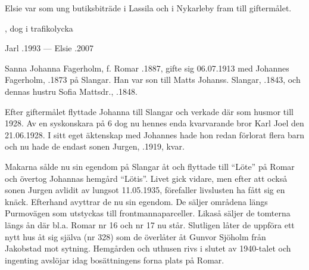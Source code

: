 Elsie var som ung butiksbiträde i Lassila och i Nykarleby fram till giftermålet.
\begin{jhchildren}
  \item {}
  \item {}, dog i trafikolycka
\end{jhchildren}

Jarl .1993  ---  Elsie .2007



%

%
Sanna Johanna Fagerholm, f. Romar .1887, gifte sig 06.07.1913 med Johannes Fagerholm, .1873 på Slangar. Han var son till Matts Johanss. Slangar, .1843, och dennas hustru Sofia Mattsdr., .1848.

Efter giftermålet flyttade Johanna till Slangar och verkade där som husmor till 1928. Av en syskonskara på 6 dog nu hennes enda kvarvarande bror Karl Joel den 21.06.1928. I sitt eget äktenskap med Johannes hade hon redan förlorat flera barn och nu hade de endast sonen Jurgen, .1919, kvar.


Makarna sålde nu sin egendom på Slangar åt  och flyttade till ``Löte'' på Romar och övertog Johannas hemgård  ``Lötis''. Livet gick vidare, men efter att också sonen Jurgen avlidit av lungsot 11.05.1935, förefaller livslusten ha fått sig en knäck. Efterhand avyttrar de nu sin egendom. De säljer områdena  längs Purmovägen som utstyckas till frontmannaparceller. Likaså säljer de tomterna längs ån där bl.a.  Romar nr 16 och nr 17 nu står. Slutligen låter de uppföra ett nytt hus åt sig själva (nr 328) som de överlåter åt Gunvor Sjöholm från Jakobstad mot sytning. Hemgården och uthusen rivs i slutet av 1940-talet och ingenting avslöjar idag bosättningens forna plats på Romar.

